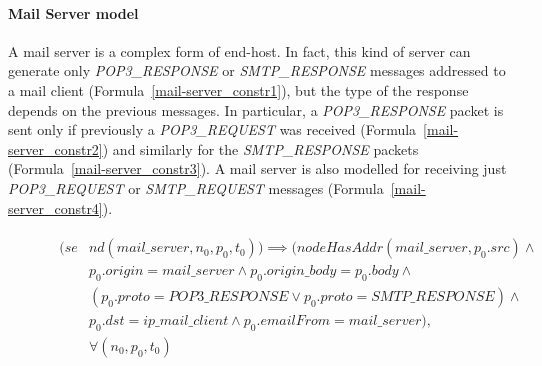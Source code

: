 \paragraph{Mail Server model} A mail server is a complex form of end-host. In fact, this kind of server can generate only \textit{POP3\_RESPONSE} or \textit{SMTP\_RESPONSE} messages addressed to a mail client (Formula~\ref{mail-server_constr1}), but the type of the response depends on the previous messages. In particular, a \textit{POP3\_RESPONSE} packet is sent only if previously a \textit{POP3\_REQUEST} was received (Formula~\ref{mail-server_constr2}) and similarly for the \textit{SMTP\_RESPONSE} packets (Formula~\ref{mail-server_constr3}). A mail server is also modelled for receiving just \textit{POP3\_REQUEST} or \textit{SMTP\_REQUEST} messages (Formula~\ref{mail-server_constr4}). 
\begin{figure}[h]
	{\footnotesize
		\begin{subequations}
			\begin{align}
				\begin{split}
					\label{mail-server_constr1}
					(se& nd(mail\_server , n_{0}, p_{0}, t_{0})) \implies (nodeHasAddr(mail\_server, p_{0}.src) \wedge \\
					& p_{0}.origin = mail\_server \wedge p_{0}.origin\_body = p_{0}.body \wedge \\
					& (p_{0}.proto = POP3\_RESPONSE \vee p_{0}.proto = SMTP\_RESPONSE) \wedge \\
					& p_{0}.dst = ip\_mail\_client \wedge p_{0}.emailFrom = mail\_server), \\
					& \forall (n_{0}, p_{0}, t_{0})
				\end{split} \\
			\end{align}
		\end{subequations}
	}
\end{figure}
